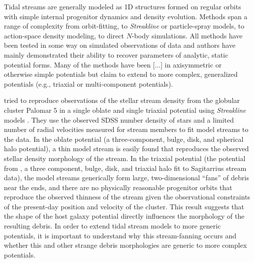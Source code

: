 \documentclass[letterpaper,12pt,preprint]{aastex}
\begin{document}
Tidal streams are generally modeled as 1D structures formed on regular orbits with simple internal progenitor dynamics and density evolution. Methods span a range of complexity from orbit-fitting, to \emph{Streakline} or particle-spray models, to action-space density modeling, to direct $N$-body simulations. All methods have been tested in some way on simulated observations of data and authors have mainly demonstrated their ability to recover parameters of analytic, static potential forms. Many of the methods have been [...] in axisymmetric or otherwise simple potentials but claim to extend to more complex, generalized potentials (e.g., triaxial or multi-component potentials). 

\citet{pearson15} tried to reproduce observations of the stellar stream density from the globular cluster Palomar 5 in a single oblate and single triaxial potential using \emph{Streakline} models \citep{kuepper12}. They use the observed SDSS number density of stars and a limited number of radial velocities measured for stream members to fit model streams to the data. In the oblate potential (a three-component, bulge, disk, and spherical halo potential), a thin model stream is easily found that reproduces the observed stellar density morphology of the stream. In the triaxial potential (the potential from \cite{law10}, a three component, bulge, disk, and triaxial halo fit to Sagitarrius stream data), the model streams generically form large, two-dimensional ``fans'' of debris near the ends, and there are no physically reasonable progenitor orbits that reproduce the observed thinness of the stream given the observational constraints of the present-day position and velocity of the cluster. This result suggests that the shape of the host galaxy potential directly influences the morphology of the resulting debris. In order to extend tidal stream models to more generic potentials, it is important to understand why this stream-fanning occurs and whether this and other strange debris morphologies are generic to more complex potentials.
\end{document}
